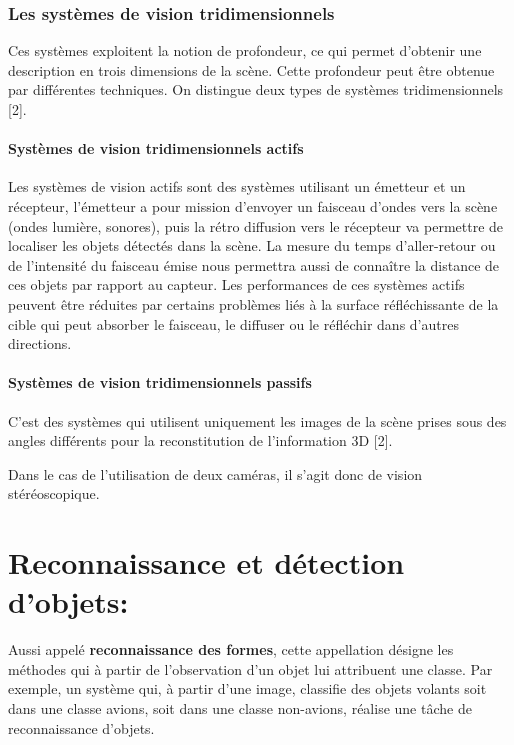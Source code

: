 \documentclass[12pt,a4paper,oneside]{book}
\begin{document}
	\subsubsection{Les systèmes de vision tridimensionnels}
	Ces systèmes exploitent la notion de profondeur, ce qui permet d’obtenir une description en trois dimensions de la scène. Cette profondeur peut être obtenue par différentes techniques. On distingue deux types de systèmes tridimensionnels [2].
	
	\paragraph{Systèmes de vision tridimensionnels actifs}
	
	Les systèmes de vision actifs sont des systèmes utilisant un émetteur et un récepteur, l'émetteur a pour mission d'envoyer  un faisceau d'ondes vers la scène (ondes lumière, sonores), puis la rétro diffusion vers le récepteur va permettre de localiser les objets détectés dans la scène. La mesure du temps d'aller-retour ou de l'intensité du faisceau émise nous permettra aussi de connaître la distance de ces objets par rapport au capteur.
	Les performances de ces systèmes actifs peuvent être réduites par certains problèmes liés à la surface réfléchissante de la cible qui peut absorber le faisceau, le diffuser ou le réfléchir dans d'autres directions.
	
	\paragraph{Systèmes de vision tridimensionnels passifs}
	C’est des systèmes qui utilisent uniquement les images de la scène prises sous des angles différents pour la reconstitution de l’information 3D [2].
	
	Dans le cas de l'utilisation de deux caméras, il s’agit donc de vision stéréoscopique. 
	
	\section{Reconnaissance et détection d'objets:}
	Aussi appelé \textbf{reconnaissance  des  formes}, cette  appellation  désigne  les  méthodes qui à partir de l’observation d’un objet lui attribuent une classe. 
	Par exemple, un système qui, à partir d’une image, classifie des objets volants soit dans une classe avions, soit dans une classe non-avions, réalise une tâche de reconnaissance d’objets.
	
\end{document}
